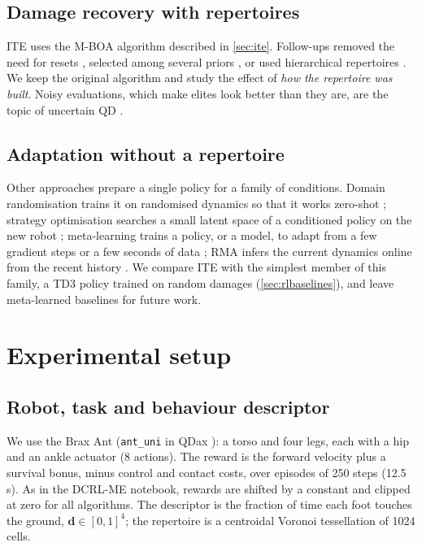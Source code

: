 \documentclass[11pt,a4paper]{article}
\begin{document}
\subsection{Damage recovery with repertoires}
ITE \citep{cully2015robots} uses the M-BOA algorithm described in \cref{sec:ite}. Follow-ups removed the need for
resets \citep{chatzilygeroudis2018reset}, selected among several priors \citep{kaushik2020adaptive}, or used
hierarchical repertoires \citep{allard2022online}. We keep the original algorithm and study the effect of
\emph{how the repertoire was built}. Noisy evaluations, which make elites look better than they are, are the topic of
uncertain QD \citep{flageat2023uncertain}.

\subsection{Adaptation without a repertoire}
Other approaches prepare a single policy for a family of conditions. Domain randomisation trains it on randomised
dynamics so that it works zero-shot \citep{tobin2017domain,peng2018sim}; strategy optimisation searches a small
latent space of a conditioned policy on the new robot \citep{yu2019policy}; meta-learning trains a policy, or a model,
to adapt from a few gradient steps or a few seconds of data \citep{finn2017model,nagabandi2019learning}; RMA infers the
current dynamics online from the recent history \citep{kumar2021rma}. We compare ITE with the simplest member of this
family, a TD3 policy trained on random damages (\cref{sec:rlbaselines}), and leave meta-learned baselines for future
work.

\section{Experimental setup}
\subsection{Robot, task and behaviour descriptor}
We use the Brax Ant (\texttt{ant\_uni} in QDax \citep{chalumeau2023qdax}): a torso and four legs, each with a hip
and an ankle actuator (8 actions). The reward is the forward velocity plus a survival bonus, minus control and
contact costs, over episodes of 250 steps (12.5\,s). As in the DCRL-ME notebook, rewards are shifted by a constant
and clipped at zero for all algorithms. The descriptor is the fraction of time each foot touches the ground,
$\mathbf{d}\in[0,1]^4$; the repertoire is a centroidal Voronoi tessellation of 1024 cells.
\end{document}
